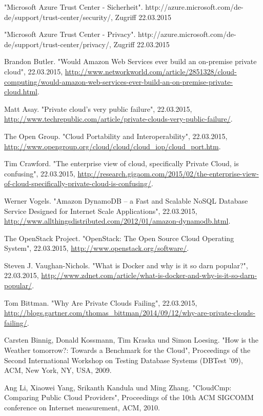 \begin{thebibliography}{1}
"Microsoft Azure Trust Center - Sicherheit". http://azure.microsoft.com/de-de/support/trust-center/security/, Zugriff 22.03.2015

"Microsoft Azure Trust Center - Privacy". http://azure.microsoft.com/de-de/support/trust-center/privacy/, Zugriff 22.03.2015

Brandon Butler. "Would Amazon Web Services ever build an on-premise private cloud", 22.03.2015, \url{http://www.networkworld.com/article/2851328/cloud-computing/would-amazon-web-services-ever-build-an-on-premise-private-cloud.html}.

Matt Asay. "Private cloud's very public failure", 22.03.2015, \url{http://www.techrepublic.com/article/private-clouds-very-public-failure/}.

The Open Group. "Cloud Portability and Interoperability", 22.03.2015, \url{http://www.opengroup.org/cloud/cloud/cloud_iop/cloud_port.htm}.

Tim Crawford. "The enterprise view of cloud, specifically Private Cloud, is confusing", 22.03.2015, \url{http://research.gigaom.com/2015/02/the-enterprise-view-of-cloud-specifically-private-cloud-is-confusing/}.

Werner Vogels. "Amazon DynamoDB – a Fast and Scalable NoSQL Database Service Designed for Internet Scale Applications", 22.03.2015, \url{http://www.allthingsdistributed.com/2012/01/amazon-dynamodb.html}.

The OpenStack Project. "OpenStack: The Open Source Cloud Operating System", 22.03.2015, \url{http://www.openstack.org/software/}.

Steven J. Vaughan-Nichols. "What is Docker and why is it so darn popular?", 22.03.2015, \url{http://www.zdnet.com/article/what-is-docker-and-why-is-it-so-darn-popular/}.

Tom Bittman. "Why Are Private Clouds Failing", 22.03.2015, \url{http://blogs.gartner.com/thomas_bittman/2014/09/12/why-are-private-clouds-failing/}.

Carsten Binnig, Donald Kossmann, Tim Kraska und Simon Loesing. "How is the Weather tomorrow?: Towards a Benchmark for the Cloud", Proceedings of the Second International Workshop on Testing Database Systems (DBTest '09), ACM, New York, NY, USA, 2009.

Ang Li, Xiaowei Yang, Srikanth Kandula und Ming Zhang. "CloudCmp: Comparing Public Cloud Providers", Proceedings of the 10th ACM SIGCOMM conference on Internet measurement, ACM, 2010.


\end{thebibliography}
